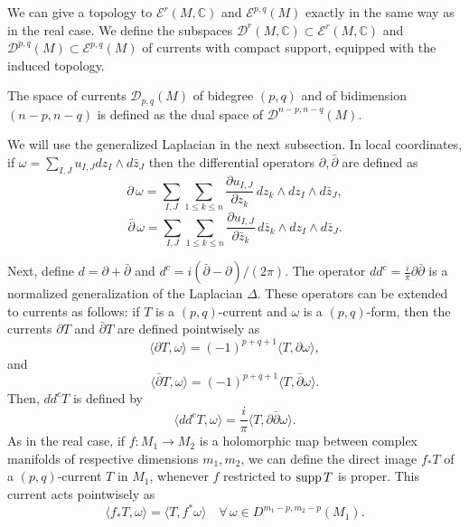 We can give a topology to $\mathcal{E}^r(M,\mathbb{C})$ and $\mathcal{E}^{p,q}(M)$ exactly in the same way as in the real case. We define the subspaces $\mathcal{D}^r(M,\mathbb{C})\subset \mathcal{E}^r(M,\mathbb{C})$ and $\mathcal{D}^{p,q}(M) \subset \mathcal{E}^{p,q}(M)$ of currents with compact support, equipped with the induced topology.\\

\begin{mydef}{}{}
The space of currents $\mathcal{D}_{p,q}(M)$ of bidegree $(p,q)$ and of bidimension $(n-p,n-q)$ is defined as the dual space of $\mathcal{D}^{n-p,n-q}(M)$.
\end{mydef}
We will use the generalized Laplacian in the next subsection. In  local coordinates, if $\omega = \sum_{I,J} u_{I,J} dz_{I}\wedge d\bar z_{J}$ then the differential operators $\partial,\bar{\partial}$ are defined as
$$\partial\,\omega = \sum_{I,J}\sum_{1\leq k \leq n} \frac{\partial u_{I,J}}{\partial z_k} \,dz_k\wedge dz_{I}\wedge d\bar z_{J},$$
$$\bar \partial\,\omega = \sum_{I,J}\sum_{1\leq k \leq n} \frac{\partial u_{I,J}}{\partial \bar{z}_k} \,d\bar{z}_k\wedge dz_{I}\wedge d\bar z_{J}.$$

Next, define $d = \partial + \bar \partial$ and $d^c = i(\bar \partial - \partial)/(2\pi)$. The operator $dd^c = \frac{i}{\pi}\partial \bar \partial$ is a normalized generalization of the Laplacian $\Delta$. These operators can be extended to currents as follows: if $T$ is a $(p,q)$-current and $\omega$ is a $(p,q)$-form, then the currents $\partial T$ and $\bar \partial T$ are defined pointwisely as
$$ \langle \partial T, \omega\rangle = (-1)^{p+q+1}\langle T,\partial \omega \rangle,$$
and 
$$ \langle \bar\partial T, \omega\rangle = (-1)^{p+q+1}\langle T,\bar \partial \omega \rangle.$$
Then, $dd^c T$ is defined by
$$ \langle dd^c T , \omega \rangle = \frac{i}{\pi} \langle T , \partial \bar \partial \omega \rangle.$$
As in the real case, if $f:M_1\rightarrow M_2$ is a holomorphic map between complex manifolds of respective dimensions $m_1,m_2$, we can define the direct image $f_*T$ of a $(p,q)$-current $T$ in $M_1$, whenever $f$ restricted to $\text{supp}\, T$ is proper. This current acts pointwisely as
$$\langle f_*T,\omega\rangle = \langle T , f^*\omega\rangle \quad \forall \,\omega \in D^{m_1-p,m_2-p}(M_1).$$

